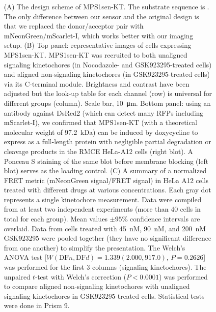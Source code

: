 \begin{figure}
    \noindent\justifying (A) The design scheme of MPS1sen-KT. The  substrate sequence is . The only difference between our sensor and the original design \cite{MPS1senor} is that we replaced the donor/acceptor pair with mNeonGreen/mScarlet-I, which works better with our imaging setup. (B) Top panel: representative images of cells expressing MPS1sen-KT. MPS1sen-KT was recruited to both unaligned signaling kinetochores (in Nocodazole- and GSK923295-treated cells) and aligned non-signaling kinetochores (in GSK923295-treated cells) via its C-terminal  module. Brightness and contrast have been adjusted but the look-up table for each channel (row) is universal for different groups (column). Scale bar, \SI{10}{\micro m}. Bottom panel: using an antibody against DsRed2 (which can detect many RFPs including mScarlet-I), we confirmed that MPS1sen-KT (with a theoretical molecular weight of \SI{97.2}{kDa}) can be induced by doxycycline to express as a full-length protein with negligible partial degradation or cleavage products in the RMCE HeLa-A12 cells (right blot). A Ponceau S staining of the same blot before membrane blocking (left blot) serves as the loading control. (C) A summary of a normalized FRET metric (mNeonGreen signal/FRET signal) in HeLa A12 cells treated with different drugs at various concentrations. Each gray dot represents a single kinetochore measurement. Data were compiled from at least two independent experiments (more than 40 cells in total for each group). Mean values $\pm 95\%$ confidence intervals are overlaid. Data from cells treated with \SI{45}{nM}, \SI{90}{nM}, and \SI{200}{nM} GSK923295 were pooled together (they have no significant difference from one another) to simplify the presentation. The Welch's ANOVA test [$W(\text{DF}n, \text{DF}d) = 1.339 (2.000, 917.0)$, $P = 0.2626$] was performed for the first 3 columns (signaling kinetochores). The unpaired $t$-test with Welch's correction ($P < 0.0001$) was performed to compare aligned non-signaling kinetochores with unaligned signaling kinetochores in GSK923295-treated cells. Statistical tests were done in Prism 9.
    \label{MPS1sen-KT}
\end{figure}









